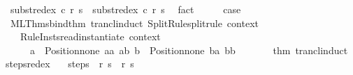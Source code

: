 \begin{isabellebody}
\ {\isachardoublequoteopen}{\isasymGamma}{\isasymturnstile}\ {\isacharparenleft}subst{\isacharunderscore}redex\ c\ r{\isacharprime}{\isacharprime}{\isacharcomma}\ s{\isacharprime}{\isacharprime}{\isacharparenright}\ {\isasymrightarrow}\isactrlsup {\isacharasterisk}\ {\isacharparenleft}subst{\isacharunderscore}redex\ c\ r{\isacharprime}{\isacharcomma}\ s{\isacharprime}{\isacharparenright}{\isachardoublequoteclose}\ \isamarkupfalse%
\ fact\isanewline
\ \ \isamarkupfalse%
\ \isamarkupfalse%
\ {\isacharquery}case\ \isacommand{{\isachardot}}\isamarkupfalse%
\isanewline
{}\isamarkupfalse%
%
\endisatagproof
{\isafoldproof}%
%
\isadelimproof
\isanewline
%
\endisadelimproof
%
\isadelimML
\isanewline
%
\endisadelimML
%
\isatagML
{}\isamarkupfalse%
\ {\isacartoucheopen}\isanewline
\ \ ML{\isacharunderscore}Thms{\isachardot}bind{\isacharunderscore}thm\ {\isacharparenleft}{\isachardoublequote}trancl{\isacharunderscore}induct{}{\isachardoublequote}{\isacharcomma}\ Split{\isacharunderscore}Rule{\isachardot}split{\isacharunderscore}rule\ {\isacharat}{\isacharbraceleft}context{\isacharbraceright}\isanewline
\ \ \ \ {\isacharparenleft}Rule{\isacharunderscore}Insts{\isachardot}read{\isacharunderscore}instantiate\ {\isacharat}{\isacharbraceleft}context{\isacharbraceright}\isanewline
\ \ \ \ \ \ {\isacharbrackleft}{\isacharparenleft}{\isacharparenleft}{\isacharparenleft}{\isachardoublequote}a{\isachardoublequote}{\isacharcomma}\ {}{\isacharparenright}{\isacharcomma}\ Position{\isachardot}none{\isacharparenright}{\isacharcomma}\ {\isachardoublequote}{\isacharparenleft}aa{\isacharcomma}\ ab{\isacharparenright}{\isachardoublequote}{\isacharparenright}{\isacharcomma}\ {\isacharparenleft}{\isacharparenleft}{\isacharparenleft}{\isachardoublequote}b{\isachardoublequote}{\isacharcomma}\ {}{\isacharparenright}{\isacharcomma}\ Position{\isachardot}none{\isacharparenright}{\isacharcomma}\ {\isachardoublequote}{\isacharparenleft}ba{\isacharcomma}\ bb{\isacharparenright}{\isachardoublequote}{\isacharparenright}{\isacharbrackright}\ {\isacharbrackleft}{\isacharbrackright}\isanewline
\ \ \ \ \ \ {\isacharat}{\isacharbraceleft}thm\ trancl{\isacharunderscore}induct{\isacharbraceright}{\isacharparenright}{\isacharparenright}{\isacharsemicolon}\isanewline
{\isacartoucheclose}%
\endisatagML
{\isafoldML}%
%
\isadelimML
\isanewline
%
\endisadelimML
\isanewline
{}\isamarkupfalse%
\ steps{\isacharunderscore}redex{\isacharprime}{\isacharcolon}\isanewline
\ \ \ steps{\isacharcolon}\ {\isachardoublequoteopen}{\isasymGamma}{\isasymturnstile}\ {\isacharparenleft}r{\isacharcomma}\ s{\isacharparenright}\ {\isasymrightarrow}\isactrlsup {\isacharplus}\ {\isacharparenleft}r{\isacharprime}{\isacharcomma}\ s{\isacharprime}{\isacharparenright}{\isachardoublequoteclose}\isanewline

\end{isabellebody}
